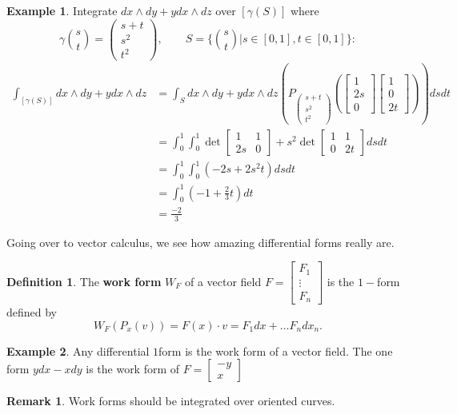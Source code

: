 \documentclass[10pt, oneside]{article}
\theoremstyle{definition}
\newtheorem{exmp}{Example}[section]
\newtheorem{defn}{Definition}
\newtheorem{rem}{Remark}
\begin{document}
\begin{exmp}
    Integrate $dx \wedge dy + ydx \wedge dz$ over $[\gamma(S)]$ where 
    \[\gamma\binom{s}{t} = \begin{pmatrix}
        s + t \\ s^2 \\ t^2
    \end{pmatrix}, \qquad S = \{\binom{s}{t} | s \in [0,1], t \in [0,1]\}:\]
    \begin{align*}
        \int_{[\gamma(S)]}dx \wedge dy + ydx \wedge dz &= \int_{S} dx \wedge dy + ydx \wedge dz\left(P_{\begin{pmatrix}
        s + t \\ s^2 \\ t^2
    \end{pmatrix}} \left(\begin{bmatrix}
        1\\ 2s\\ 0
    \end{bmatrix} \begin{bmatrix}
         1\\ 0 \\ 2t
    \end{bmatrix}\right)\right)dsdt\\
    &= \int_0^1 \int_0^1 \det 
    \begin{bmatrix}
        1 & 1\\
        2s & 0
    \end{bmatrix} + s^2 \det 
    \begin{bmatrix}
        1 & 1\\
        0 & 2t
    \end{bmatrix}ds dt\\
    &= \int_0^1 \int_0^1 (-2s + 2s^2t) ds dt\\
    &= \int_0^1 (-1 + \frac{2}{3}t)dt\\
    &= \frac{-2}{3}
    \end{align*}
\end{exmp}

Going over to vector calculus, we see how amazing differential forms really are.
\begin{defn}
    The \textbf{work form} $W_F$ of a vector field $F = \begin{bmatrix}
        F_1\\ \vdots \\ F_n
    \end{bmatrix}$ is the $1-$form defined by 
    \[W_F(P_x(v)) = F(x) \cdot v = F_1dx + \dots F_ndx_n.\]
\end{defn}
\begin{exmp}
    Any differential $1$form is the work form of a vector field. The one form $ydx - xdy$ is the work form of $F = \begin{bmatrix}
        -y\\x
    \end{bmatrix}$
\end{exmp}
\begin{rem}
    Work forms should be integrated over oriented curves.
\end{rem}
\end{document}
